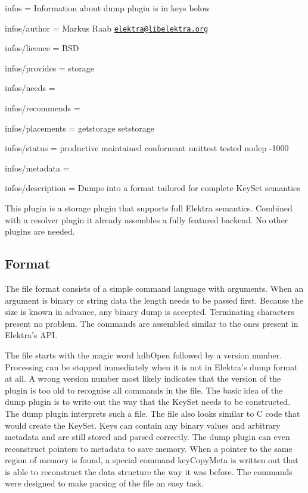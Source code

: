 
\begin{DoxyItemize}
\item infos = Information about dump plugin is in keys below
\item infos/author = Markus Raab \href{mailto:elektra@libelektra.org}{\tt elektra@libelektra.\+org}
\item infos/licence = B\+S\+D
\item infos/provides = storage
\item infos/needs =
\item infos/recommends =
\item infos/placements = getstorage setstorage
\item infos/status = productive maintained conformant unittest tested nodep -\/1000
\item infos/metadata =
\item infos/description = Dumps into a format tailored for complete Key\+Set semantics
\end{DoxyItemize}

This plugin is a storage plugin that supports full Elektra semantics. Combined with a resolver plugin it already assembles a fully featured backend. No other plugins are needed.

\subsection*{Format}

The file format consists of a simple command language with arguments. When an argument is binary or string data the length needs to be passed first. Because the size is known in advance, any binary dump is accepted. Terminating characters present no problem. The commands are assembled similar to the ones present in Elektra’s A\+P\+I.

The file starts with the magic word {\ttfamily kdb\+Open} followed by a version number. Processing can be stopped immediately when it is not in Elektra’s dump format at all. A wrong version number most likely indicates that the version of the plugin is too old to recognise all commands in the file. The basic idea of the dump plugin is to write out the way that the Key\+Set needs to be constructed. The dump plugin interprets such a file. The file also looks similar to C code that would create the Key\+Set. Keys can contain any binary values and arbitrary metadata and are still stored and parsed correctly. The dump plugin can even reconstruct pointers to metadata to save memory. When a pointer to the same region of memory is found, a special command {\ttfamily key\+Copy\+Meta} is written out that is able to reconstruct the data structure the way it was before. The commands were designed to make parsing of the file an easy task.

